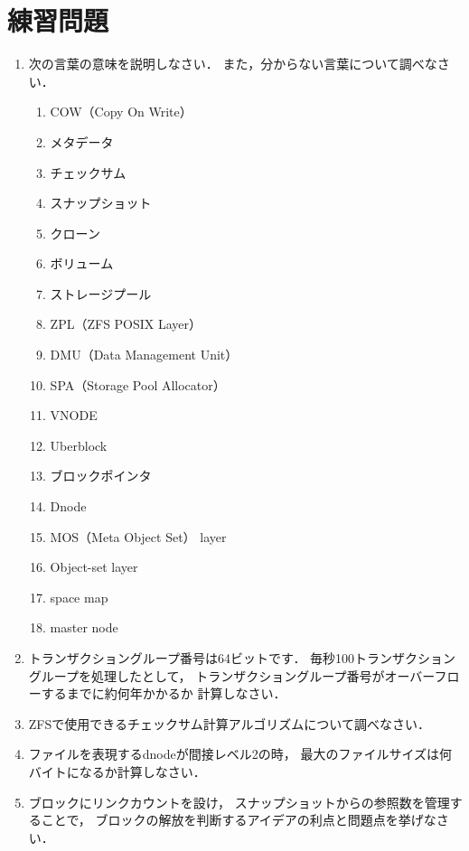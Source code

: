 \newpage
\section*{練習問題}
\begin{enumerate}
  \renewcommand{\labelenumi}{\ttfamily\arabic{chapter}.\arabic{enumi}}
  \setlength{\leftskip}{1em}
\item 次の言葉の意味を説明しなさい．
  また，分からない言葉について調べなさい．
  \begin{enumerate}
  \item COW（Copy On Write）
  \item メタデータ
  \item チェックサム
  \item スナップショット
  \item クローン
  \item ボリューム
  \item ストレージプール
  \item ZPL（ZFS POSIX Layer）
  \item DMU（Data Management Unit）
  \item SPA（Storage Pool Allocator）
  \item VNODE
  \item Uberblock
  \item ブロックポインタ
  \item Dnode
  \item MOS（Meta Object Set） layer
  \item Object-set layer
  \item space map
  \item master node
  \end{enumerate}
  \item トランザクショングループ番号は64ビットです．
    毎秒100トランザクショングループを処理したとして，
    トランザクショングループ番号がオーバーフローするまでに約何年かかるか
    計算しなさい．
  \item ZFSで使用できるチェックサム計算アルゴリズムについて調べなさい．
  \item ファイルを表現するdnodeが間接レベル2の時，
    最大のファイルサイズは何バイトになるか計算しなさい．
  \item ブロックにリンクカウントを設け，
    スナップショットからの参照数を管理することで，
    ブロックの解放を判断するアイデアの利点と問題点を挙げなさい．
\end{enumerate}
